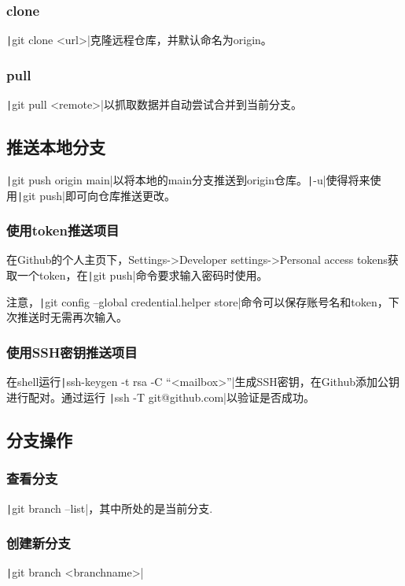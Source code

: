 \documentclass[fontset=ubuntu]{ctexart}
\begin{document}
\subsubsection{clone}
\texttt|git clone <url>|克隆远程仓库，并默认命名为origin。

\subsubsection{pull}
\texttt|git pull <remote>|以抓取数据并自动尝试合并到当前分支。

\subsection{推送本地分支}
\texttt|git push origin main|以将本地的main分支推送到origin仓库。\texttt|-u|使得将来使用\texttt|git push|即可向仓库推送更改。

\subsubsection{使用token推送项目}
在Github的个人主页下，Settings->Developer settings->Personal access tokens获取一个token，在\texttt|git push|命令要求输入密码时使用。

注意，\texttt|git config --global credential.helper store|命令可以保存账号名和token，下次推送时无需再次输入。

\subsubsection{使用SSH密钥推送项目}
在shell运行\texttt|ssh-keygen -t rsa -C “<mailbox>”|生成SSH密钥，在Github添加公钥进行配对。通过运行
\texttt|ssh -T git@github.com|以验证是否成功。

\subsection{分支操作}
\subsubsection{查看分支}
\texttt|git branch --list|，其中\*所处的是当前分支.

\subsubsection{创建新分支}
\texttt|git branch <branchname>|
\end{document}
